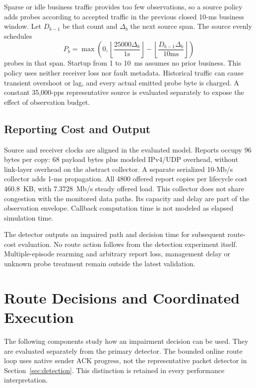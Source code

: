 \documentclass[sigconf]{acmart}
\begin{document}
Sparse or idle business traffic provides too few observations, so a source
policy adds probes according to accepted traffic in the previous closed
10-ms business window. Let $D_{b-1}$ be that count and $\Delta_b$ the next
source span. The source evenly schedules
\[
P_b=\max\!\left(0,
\left\lfloor\frac{25000\Delta_b}{1\mathrm{s}}\right\rfloor-
\left\lfloor\frac{D_{b-1}\Delta_b}{10\mathrm{ms}}\right\rfloor\right)
\]
probes in that span. Startup from 1 to 10~ms assumes no prior business.
This policy uses neither receiver loss nor fault metadata. Historical
traffic can cause transient overshoot or lag, and every actual emitted
probe byte is charged. A constant 35,000-pps representative source is
evaluated separately to expose the effect of observation budget.

\subsection{Reporting Cost and Output}
Source and receiver clocks are aligned in the evaluated model. Reports
occupy 96 bytes per copy: 68 payload bytes plus modeled IPv4/UDP overhead,
without link-layer overhead on the abstract collector. A separate serialized
10-Mb/s collector adds 1-ms propagation. All 4800 offered report copies per
lifecycle cost 460.8~KB, with 7.3728~Mb/s steady offered load. This collector
does not share congestion with the monitored data paths. Its capacity and
delay are part of the observation envelope. Callback computation time is
not modeled as elapsed simulation time.

The detector outputs an impaired path and decision time for subsequent
route-cost evaluation. No route action follows from the detection experiment
itself. Multiple-episode rearming and arbitrary report loss, management delay
or unknown probe treatment remain outside the latest validation.

\section{Route Decisions and Coordinated Execution}
\label{sec:recovery-design}
The following components study how an impairment decision can be used.
They are evaluated separately from the primary detector. The bounded online
route loop uses native sender ACK progress, not the representative packet
detector in Section~\ref{sec:detection}. This distinction is retained in
every performance interpretation.
\end{document}
